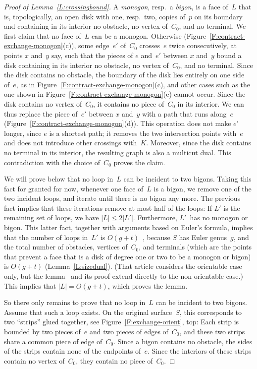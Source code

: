 \documentclass[11pt]{article}
\theoremstyle{plain}  \newtheorem{theorem}{Theorem}[section]
\theoremstyle{definition}
\begin{document}
\begin{proof}[Proof of Lemma~\ref{L:crossingbound}]
  A \emph{monogon}, resp.\ a \emph{bigon}, is a face of~$L$ that is,
  topologically, an open disk with one, resp.\ two, copies of~$p$ on its
  boundary and containing in its interior no obstacle, no vertex of~$C_0$,
  and no terminal.  We first claim that no face of~$L$ can be a monogon.
  Otherwise (Figure~\ref{F:contract-exchange-monogon}(c)), some edge~$e'$
  of~$C_0$ crosses~$e$ twice consecutively, at points $x$ and~$y$ say, such
  that the pieces of $e$ and~$e'$ between $x$ and~$y$ bound a disk
  containing in its interior no obstacle, no vertex of~$C_0$, and no
  terminal.  Since the disk contains no obstacle, the boundary of the disk
  lies entirely on one side of~$e$, as in
  Figure~\ref{F:contract-exchange-monogon}(c), and other cases such as the
  one shown in Figure~\ref{F:contract-exchange-monogon}(e) cannot occur.
  Since the disk contains no vertex of~$C_0$, it contains no piece of~$C_0$
  in its interior.  We can thus replace the piece of~$e'$ between $x$
  and~$y$ with a path that runs along~$e$
  (Figure~\ref{F:contract-exchange-monogon}(d)).  This operation does not
  make $e'$ longer, since $e$ is a shortest path; it removes the two
  intersection points with~$e$ and does not introduce other crossings
  with~$K$.  Moreover, since the disk contains no terminal in its interior,
  the resulting graph is also a multicut dual.  This contradiction with the
  choice of~$C_0$ proves the claim.
 
  We will prove below that no loop in~$L$ can be incident to two bigons.
  Taking this fact for granted for now, whenever one face of~$L$ is a
  bigon, we remove one of the two incident loops, and iterate until there
  is no bigon any more.  The previous fact implies that these iterations
  remove at most half of the loops: If $L'$ is the remaining set of loops,
  we have $|L|\le2|L'|$.  Furthermore, $L'$~has no monogon or bigon.  This
  latter fact, together with arguments based on Euler's formula, implies
  that the number of loops in~$L'$ is
  $O(g+t)$~\cite[Lemma~2.1]{ccelw-scsh-08}, because $S$ has Euler
  genus~$g$, and the total number of obstacles, vertices of~$C_0$, and
  terminals (which are the points that prevent a face that is a disk of
  degree one or two to be a monogon or bigon) is $O(g+t)$
  (Lemma~\ref{L:sizedual}).  (That article considers the orientable case
  only, but the lemma~\cite[Lemma~2.1]{ccelw-scsh-08} and its proof extend
  directly to the non-orientable case.)  This implies that $|L|=O(g+t)$,
  which proves the lemma.

  So there only remains to prove that no loop in~$L$ can be incident to two
  bigons.  Assume that such a loop exists.  On the original surface~$S$,
  this corresponds to two ``strips'' glued together, see
  Figure~\ref{F:exchange-orient}, top: Each strip is bounded by two pieces
  of~$e$ and two pieces of edges of~$C_0$, and these two strips share a
  common piece of edge of~$C_0$.  Since a bigon contains no obstacle, the
  sides of the strips contain none of the endpoints of~$e$.  Since the
  interiors of these strips contain no vertex of~$C_0$, they contain no
  piece of~$C_0$.


\end{proof}
\end{document}
